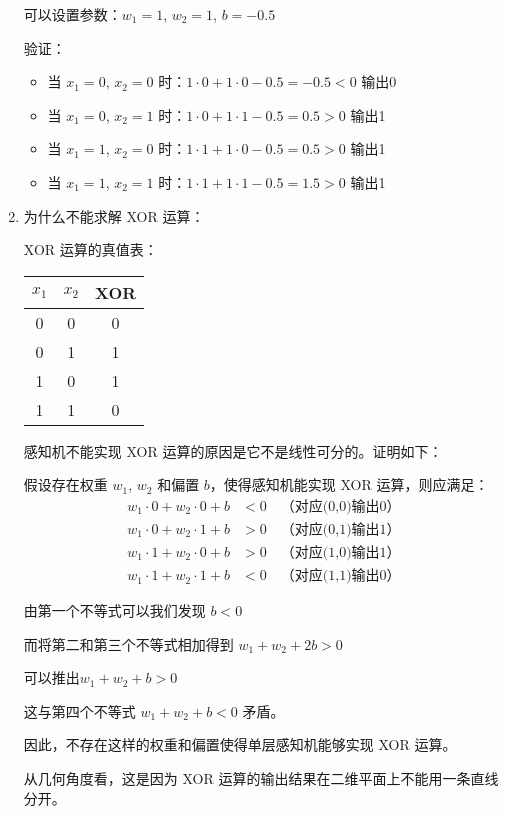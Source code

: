 \documentclass[UTF8]{ctexart}
\begin{document}
\begin{enumerate}
		可以设置参数：$w_1 = 1$, $w_2 = 1$, $b = -0.5$
		
		验证：
		\begin{itemize}
			\item 当 $x_1=0$, $x_2=0$ 时：$1\cdot0 + 1\cdot0 - 0.5 = -0.5 < 0$ 输出0
			\item 当 $x_1=0$, $x_2=1$ 时：$1\cdot0 + 1\cdot1 - 0.5 = 0.5 > 0$ 输出1
			\item 当 $x_1=1$, $x_2=0$ 时：$1\cdot1 + 1\cdot0 - 0.5 = 0.5 > 0$ 输出1
			\item 当 $x_1=1$, $x_2=1$ 时：$1\cdot1 + 1\cdot1 - 0.5 = 1.5 > 0$ 输出1
		\end{itemize}
		
		\item 为什么不能求解 XOR 运算：
		
		XOR 运算的真值表：
		\begin{center}
			\begin{tabular}{|c|c|c|}
				\hline
				$x_1$ & $x_2$ & XOR \\
				\hline
				0 & 0 & 0 \\
				0 & 1 & 1 \\
				1 & 0 & 1 \\
				1 & 1 & 0 \\
				\hline
			\end{tabular}
		\end{center}
		
		感知机不能实现 XOR 运算的原因是它不是线性可分的。证明如下：
		
		假设存在权重 $w_1$, $w_2$ 和偏置 $b$，使得感知机能实现 XOR 运算，则应满足：
		\begin{align*}
			w_1\cdot0 + w_2\cdot0 + b &< 0 \quad \text{（对应(0,0)输出0）} \\
			w_1\cdot0 + w_2\cdot1 + b &> 0 \quad \text{（对应(0,1)输出1）} \\
			w_1\cdot1 + w_2\cdot0 + b &> 0 \quad \text{（对应(1,0)输出1）} \\
			w_1\cdot1 + w_2\cdot1 + b &< 0 \quad \text{（对应(1,1)输出0）}
		\end{align*}
		
		由第一个不等式可以我们发现 $b < 0$
		
		而将第二和第三个不等式相加得到 $w_1 + w_2 + 2b > 0$
		
		可以推出$w_1 + w_2 + b > 0$
		
		这与第四个不等式 $w_1 + w_2 + b < 0$ 矛盾。
		
		因此，不存在这样的权重和偏置使得单层感知机能够实现 XOR 运算。
		
		从几何角度看，这是因为 XOR 运算的输出结果在二维平面上不能用一条直线分开。
	\end{enumerate}
	
\end{document}
